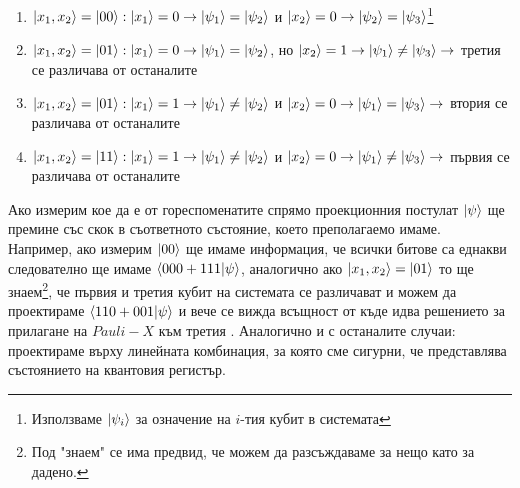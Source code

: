 \documentclass[11pt,oneside,a4paper]{article}
\begin{document}
\begin{enumerate}
    \item ${\left\vert{x_1,x_2}\right\rangle} = {\left\vert{00}\right\rangle}: {\left\vert{x_1}\right\rangle} = 0 \rightarrow {\left\vert{\psi_1}\right\rangle} = {\left\vert{\psi_2}\right\rangle}$ и ${\left\vert{x_2}\right\rangle} = 0 \rightarrow {\left\vert{\psi_2}\right\rangle} = {\left\vert{\psi_3}\right\rangle}$\footnote{
    Използваме ${\left\vert{\psi_i}\right\rangle}$ за означение на $i$-тия кубит в системата
    }
    \item ${\left\vert{x_1,x_2}\right\rangle} = {\left\vert{01}\right\rangle}: {\left\vert{x_1}\right\rangle} = 0 \rightarrow {\left\vert{\psi_1}\right\rangle} = {\left\vert{\psi_2}\right\rangle}$, но ${\left\vert{x_2}\right\rangle} = 1 \rightarrow {\left\vert{\psi_1}\right\rangle} \neq {\left\vert{\psi_3}\right\rangle} \rightarrow$ третия се различава от останалите
    \item ${\left\vert{x_1,x_2}\right\rangle} = {\left\vert{01}\right\rangle}: {\left\vert{x_1}\right\rangle} = 1 \rightarrow {\left\vert{\psi_1}\right\rangle} \neq {\left\vert{\psi_2}\right\rangle}$ и ${\left\vert{x_2}\right\rangle} = 0 \rightarrow {\left\vert{\psi_1}\right\rangle} = {\left\vert{\psi_3}\right\rangle} \rightarrow$ втория се различава от останалите
    \item ${\left\vert{x_1,x_2}\right\rangle} = {\left\vert{11}\right\rangle}: {\left\vert{x_1}\right\rangle} = 1 \rightarrow {\left\vert{\psi_1}\right\rangle} \neq {\left\vert{\psi_2}\right\rangle}$ и ${\left\vert{x_2}\right\rangle} = 0 \rightarrow {\left\vert{\psi_1}\right\rangle} \neq {\left\vert{\psi_3}\right\rangle} \rightarrow$ първия се различава от останалите
\end{enumerate}
Ако измерим кое да е от гореспоменатите спрямо проекционния постулат ${\left\vert{\psi}\right\rangle}$ ще премине със скок в съответното състояние, което преполагаемо имаме.\\
Например, ако измерим ${\left\vert{00}\right\rangle}$ ще имаме информация, че всички битове са еднакви следователно ще имаме $\braket{000 + 111|\psi}$, аналогично ако ${\left\vert{x_1,x_2}\right\rangle} = {\left\vert{01}\right\rangle}$ то ще знаем\footnote{
Под "знаем" се има предвид, че можем да разсъждаваме за нещо като за дадено.
}, че първия и третия кубит на системата се различават и можем да проектираме $\braket{110+001|\psi}$ и вече се вижда всъщност от къде идва решението за прилагане на $Pauli-X$ към третия \cite{dirac}. Аналогично и с останалите случаи: проектираме върху линейната комбинация, за която сме сигурни, че представлява състоянието на квантовия регистър.
\end{document}
